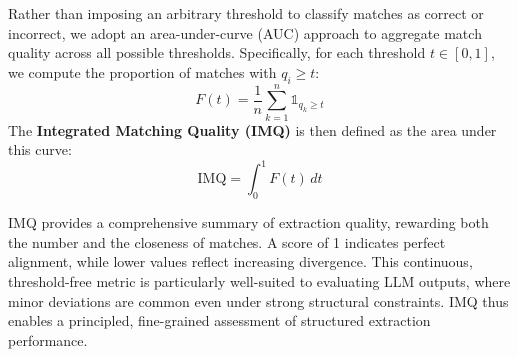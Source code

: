 Rather than imposing an arbitrary threshold to classify matches as correct or incorrect, we adopt an area-under-curve (AUC) approach to aggregate match quality across all possible thresholds. Specifically, for each threshold $t \in [0, 1]$, we compute the proportion of matches with $q_i \geq t$:
$$
F(t) = \frac{1}{n} \sum_{k=1}^{n} \mathbb{1}_{q_k \geq t}
$$
The \textbf{Integrated Matching Quality (IMQ)} is then defined as the area under this curve:
$$
\text{IMQ} = \int_{0}^{1} F(t) \, dt
$$

IMQ provides a comprehensive summary of extraction quality, rewarding both the number and the closeness of matches. A score of 1 indicates perfect alignment, while lower values reflect increasing divergence. This continuous, threshold-free metric is particularly well-suited to evaluating LLM outputs, where minor deviations are common even under strong structural constraints. IMQ thus enables a principled, fine-grained assessment of structured extraction performance.

\begin{comment}
\subsection{Qualitative Analysis via Matching Scores}
\joseph{only include / rephrase these ideas if we manage to include some qualitative analysis in \Cref{sec:results}!}
The entry-level matching scores produced by our evaluation protocol provide direct insight into extraction errors. Low-quality matches—those with low similarity scores—highlight cases where the model either hallucinated content or failed to extract a ground truth entry. By inspecting these specific alignments, we can efficiently diagnose systematic errors or challenging cases in the extraction process.
\end{comment}
